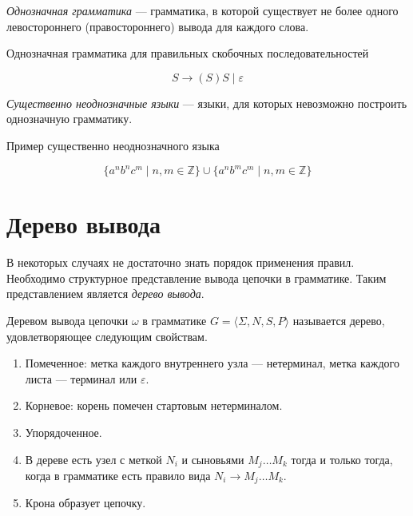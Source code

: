 \begin{definition}
  \textit{Однозначная грамматика} --- грамматика, в которой существует не более одного левостороннего (правостороннего) вывода для каждого слова.
\end{definition}

\begin{example}
  Однозначная грамматика для правильных скобочных последовательностей

\[
    S \to (S)S \mid \varepsilon
\]
\end{example}

\begin{definition}
  \textit{Существенно неоднозначные языки} --- языки, для которых невозможно построить однозначную грамматику.
\end{definition}

\begin{example}
  Пример существенно неоднозначного языка

\[\{a^n b^n c^m \mid n, m \in \mathds{Z}\} \cup \{a^n b^m c^m \mid n,m \in \mathds{Z}\}\]
\end{example}

\section{Дерево вывода}\label{sect:DerivTree}
В некоторых случаях не достаточно знать порядок применения правил.
Необходимо структурное представление вывода цепочки в грамматике.
Таким представлением является \textit{дерево вывода}.
\begin{definition}
Деревом вывода цепочки $\omega$ в грамматике $G=\langle \Sigma, N, S, P \rangle$ называется дерево, удовлетворяющее следующим свойствам.

\begin{enumerate}
  \item Помеченное: метка каждого внутреннего узла --- нетерминал, метка каждого листа --- терминал или $\varepsilon$.
  \item Корневое: корень помечен стартовым нетерминалом.
  \item Упорядоченное.
  \item В дереве есть узел с меткой $N_i$ и сыновьями $M_j \dots M_k$ тогда и только тогда, когда в грамматике есть правило вида $N_i \to M_j \dots M_k$.
  \item Крона образует цепочку.
\end{enumerate}
\end{definition}

